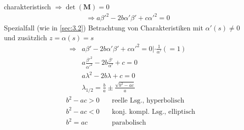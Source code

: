 charakteristisch $\Rightarrow \det(\bm{M})=0$
\begin{align}
\Rightarrow a \beta'^2 - 2b \alpha' \beta' + c \alpha'^2 = 0
\end{align}
Spezialfall (wie in \ref{sec:3.2}) Betrachtung von Charakteristiken mit $\alpha'(s) \neq 0$ und zusätzlich $z = \alpha(s)=s$
\begin{align*}
\Rightarrow &a \beta' - 2b \alpha' \beta' + c \alpha'^2 = 0 | \cdot \frac{1}{\alpha'}(=1) \\
&a \frac{\beta'^2}{\alpha'^2} - 2b \frac{\beta'}{\alpha'} + c = 0 \\
&a\lambda^2-2 b \lambda + c = 0 \\
&\lambda_{1/2}=\frac{b}{a} \pm \frac{\sqrt{b^2-ac}}{a}  
\end{align*}
\begin{align*}
&b^2-ac >0 \quad &\textrm{reelle Lsg., hyperbolisch} \\
&b^2-ac <0 \quad &\textrm{konj. kompl. Lsg., elliptisch} \\
&b^2=ac \quad &\textrm{parabolisch}
\end{align*}